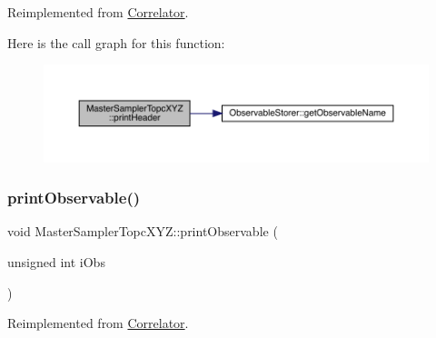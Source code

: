 Reimplemented from \mbox{\hyperlink{class_correlator_ac7c5a07d7cbee97c417a1659b93083b2}{Correlator}}.

Here is the call graph for this function\+:\nopagebreak
\begin{figure}[H]
\begin{center}
\leavevmode
\includegraphics[width=350pt]{class_master_sampler_topc_x_y_z_a630a504ecbf3ceb517ebeefb39c3faff_cgraph}
\end{center}
\end{figure}
\mbox{\label{class_master_sampler_topc_x_y_z_ab2312c9e9dc1e9deeb5bce36784372ac}} 
\subsubsection{\texorpdfstring{printObservable()}{printObservable()}}
{\footnotesize\ttfamily void Master\+Sampler\+Topc\+X\+Y\+Z\+::print\+Observable (\begin{DoxyParamCaption}\item[{unsigned int}]{i\+Obs }\end{DoxyParamCaption})\hspace{0.3cm}{\ttfamily [virtual]}}



Reimplemented from \mbox{\hyperlink{class_correlator_a15744ddb9f2b71fff34ac762d101df38}{Correlator}}.

